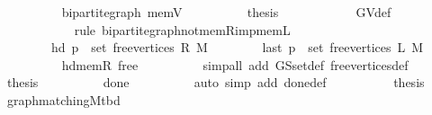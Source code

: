 \begin{isabellebody}
\ \ \ \ \ \ \ \ \isamarkupfalse%
\ bipartite{\isacharunderscore}{\kern0pt}graph\ mem{\isacharunderscore}{\kern0pt}V{\isacharparenleft}{\kern0pt}{}{\isacharparenright}{\kern0pt}\isanewline
\ \ \ \ \ \ \ \ \isamarkupfalse%
\ {\isacharquery}{\kern0pt}thesis\isanewline
\ \ \ \ \ \ \ \ \ \ \isamarkupfalse%
\ G{\isachardot}{\kern0pt}V{\isacharunderscore}{\kern0pt}def\isanewline
\ \ \ \ \ \ \ \ \ \ \isamarkupfalse%
\ {\isacharparenleft}{\kern0pt}rule\ bipartite{\isacharunderscore}{\kern0pt}graph{\isachardot}{\kern0pt}not{\isacharunderscore}{\kern0pt}mem{\isacharunderscore}{\kern0pt}R{\isacharunderscore}{\kern0pt}imp{\isacharunderscore}{\kern0pt}mem{\isacharunderscore}{\kern0pt}L{\isacharparenright}{\kern0pt}\isanewline
\ \ \ \ \ \ \isamarkupfalse%
\isanewline
\ \ \ \ \ \ \isamarkupfalse%
\isanewline
\ \ \ \ \ \ \ \ {\isachardoublequoteopen}hd\ p\ {\isasymin}\ set\ {\isacharparenleft}{\kern0pt}free{\isacharunderscore}{\kern0pt}vertices\ R\ M{\isacharparenright}{\kern0pt}{\isachardoublequoteclose}\isanewline
\ \ \ \ \ \ \ \ {\isachardoublequoteopen}last\ p\ {\isasymin}\ set\ {\isacharparenleft}{\kern0pt}free{\isacharunderscore}{\kern0pt}vertices\ L\ M{\isacharparenright}{\kern0pt}{\isachardoublequoteclose}\isanewline
\ \ \ \ \ \ \ \ \isamarkupfalse%
\ hd{\isacharunderscore}{\kern0pt}mem{\isacharunderscore}{\kern0pt}R\ free\isanewline
\ \ \ \ \ \ \ \ \isamarkupfalse%
\ {\isacharparenleft}{\kern0pt}simp{\isacharunderscore}{\kern0pt}all\ add{\isacharcolon}{\kern0pt}\ G{\isachardot}{\kern0pt}S{\isachardot}{\kern0pt}set{\isacharunderscore}{\kern0pt}def\ free{\isacharunderscore}{\kern0pt}vertices{\isacharunderscore}{\kern0pt}def{\isacharparenright}{\kern0pt}\isanewline
\ \ \ \ \ \ \isamarkupfalse%
\ {\isacharquery}{\kern0pt}thesis\isanewline
\ \ \ \ \ \ \ \ \isamarkupfalse%
\ done{\isacharunderscore}{\kern0pt}{}\isanewline
\ \ \ \ \ \ \ \ \isamarkupfalse%
\ {\isacharparenleft}{\kern0pt}auto\ simp\ add{\isacharcolon}{\kern0pt}\ done{\isacharunderscore}{\kern0pt}{}{\isacharunderscore}{\kern0pt}def{\isacharparenright}{\kern0pt}\isanewline
\ \ \ \ \isamarkupfalse%
\ \isacommand{{\isacharbraceright}{\kern0pt}}\isamarkupfalse%
\isanewline
\ \ \isamarkupfalse%
\ {\isacharquery}{\kern0pt}thesis\isanewline
\ \ \ \ \isamarkupfalse%
\ graph{\isacharunderscore}{\kern0pt}matching{\isacharunderscore}{\kern0pt}M{\isacharunderscore}{\kern0pt}tbd\isanewline

\end{isabellebody}
